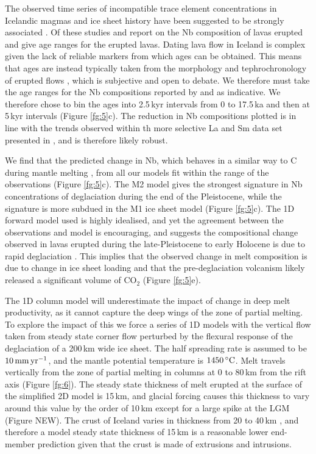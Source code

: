 \documentclass[draft,linenumbers]{agujournal2018}
\begin{document}
The observed time series of incompatible trace element concentrations in Icelandic magmas and ice sheet history have been suggested to be strongly associated \citep{jull-1996,gee-etal-1998,maclennan-etal-2002,sinton-etal-2005,eason-etal-2015}. Of these studies \cite{gee-etal-1998} and \cite{eason-etal-2015} report on the Nb composition of lavas erupted and give age ranges for the erupted lavas. Dating lava flow in Iceland is complex given the lack of reliable markers from which ages can be obtained. This means that ages are instead typically taken from the morphology and tephrochronology of erupted flows \citep{maclennan-etal-2002}, which is subjective and open to debate. We therefore must take the age ranges for the Nb compositions reported by \cite{gee-etal-1998} and \cite{eason-etal-2015} as indicative. We therefore chose to bin the ages into 2.5\,kyr intervals from 0 to 17.5\,ka and then at 5\,kyr intervals (Figure \ref{fg:5}c). The reduction in Nb compositions plotted is in line with the trends observed within th more selective La and Sm data set presented in \cite{maclennan-etal-2002}, and is therefore likely robust.

We find that the predicted change in Nb, which behaves in a similar way to C during mantle melting \citep{saal-etal-2002,rosenthal-etal-2015}, from all our models fit within the range of the observations (Figure \ref{fg:5}c). The M2 model gives the strongest signature in Nb concentrations of deglaciation during the end of the Pleistocene, while the signature is more subdued in the M1 ice sheet model (Figure \ref{fg:5}c). The 1D forward model used is highly idealised, and yet the agreement between the observations and model is encouraging, and suggests the compositional change observed in lavas erupted during the late-Pleistocene to early Holocene is due to rapid deglaciation \citep{maclennan-etal-2002,sinton-etal-2005,gee-etal-1998,eason-etal-2015}. This implies that the observed change in melt composition is due to change in ice sheet loading and that the pre-deglaciation volcanism likely released a significant volume of CO$_{2}$ (Figure \ref{fg:5}e).

The 1D column model will underestimate the impact of change in deep melt productivity, as it cannot capture the deep wings of the zone of partial melting. To explore the impact of this we force a series of 1D models with the vertical flow taken from steady state corner flow perturbed by the flexural response of the deglaciation of a 200\,km wide ice sheet. The half spreading rate is assumed to be $10\rm\,mm\,yr^{-1}$, and the mantle potential temperature is $1450\rm\,^{\circ}C$. Melt travels vertically from the zone of partial melting in columns at 0 to 80\,km from the rift axis (Figure \ref{fg:6}). The steady state thickness of melt erupted at the surface of the simplified 2D model is 15\,km, and glacial forcing causes this thickness to vary around this value by the order of 10\,km except for a large spike at the LGM (Figure NEW). The crust of Iceland varies in thickness from 20 to 40\,km \citep[e.g.][]{jenkins-etal-2018}, and therefore a model steady state thickness of 15\,km is a reasonable lower end-member prediction given that the crust is made of extrusions and intrusions.
\end{document}
